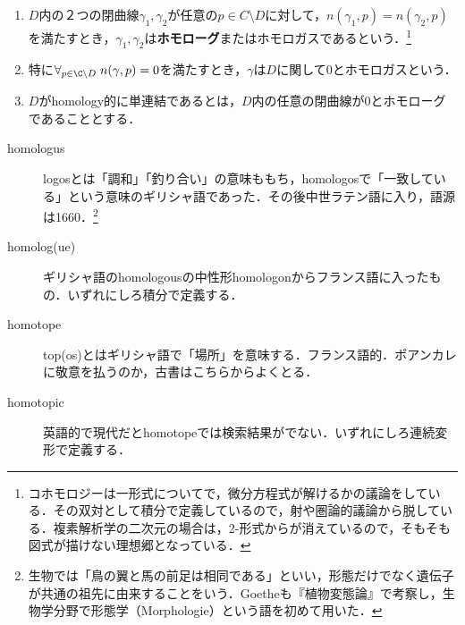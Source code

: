 \documentclass[uplatex, dvipdfmx]{jsreport}
\begin{document}
\begin{definition}[homologous]\mbox{}
    \begin{enumerate}
        \item $D$内の２つの閉曲線$\gamma_1,\gamma_2$が任意の$p\in C\setminus D$に対して，$n(\gamma_1,p)=n(\gamma_2,p)$を満たすとき，$\gamma_1,\gamma_2$は\textbf{ホモローグ}またはホモロガスであるという．\footnote{コホモロジーは一形式についてで，微分方程式が解けるかの議論をしている．その双対として積分で定義しているので，射や圏論的議論から脱している．複素解析学の二次元の場合は，2-形式からが消えているので，そもそも図式が描けない理想郷となっている．}
        \item 特に$\forall_{p\in\C\setminus D}\;n(\gamma,p)=0$を満たすとき，$\gamma$は$D$に関して$0$とホモロガスという．
        \item $D$がhomology的に単連結であるとは，$D$内の任意の閉曲線が$0$とホモローグであることとする．
    \end{enumerate}
\end{definition}
\begin{remark}[整理]\mbox{}
    \begin{description}
        \item[homologus] logosとは「調和」「釣り合い」の意味ももち，homologosで「一致している」という意味のギリシャ語であった．その後中世ラテン語に入り，語源は1660．\footnote{生物では「鳥の翼と馬の前足は相同である」といい，形態だけでなく遺伝子が共通の祖先に由来することをいう．Goetheも『植物変態論』で考察し，生物学分野で形態学（Morphologie）という語を初めて用いた．}
        \item[homolog(ue)] ギリシャ語のhomologousの中性形homologonからフランス語に入ったもの．いずれにしろ積分で定義する．
        \item[homotope] top(os)とはギリシャ語で「場所」を意味する．フランス語的．ポアンカレに敬意を払うのか，古書はこちらからよくとる．
        \item[homotopic] 英語的で現代だとhomotopeでは検索結果がでない．いずれにしろ連続変形で定義する．
    \end{description}
\end{remark}
\end{document}
